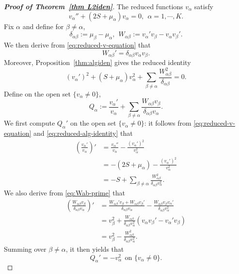 \documentclass[11pt]{article}
\numberwithin{equation}{section}
\theoremstyle{definition}
\begin{document}
\begin{proof}[\normalfont \bfseries Proof of Theorem~\ref{thm L2iden}]
The reduced functions \(v_\alpha\) satisfy
\begin{equation}\label{eq:reduced-v-equation}
	v_\alpha''+(2S+\mu_\alpha)v_\alpha=0,
	\ \  \alpha=1,\cdots,K .
\end{equation}
Fix \(\alpha\)  and  define   for \(\beta\neq\alpha\),
\[
\delta_{\alpha\beta}:=\mu_\beta-\mu_\alpha,
\ \
W_{\alpha\beta}:=v_\alpha'v_\beta-v_\alpha v_\beta' .
\]
We then derive from \eqref{eq:reduced-v-equation} that
\begin{equation}\label{eq:Wab-prime}
	W_{\alpha\beta}'
	=
	\delta_{\alpha\beta}v_\alpha v_\beta .
\end{equation}
Moreover, Proposition~\ref{thm:algiden} gives the reduced identity
\begin{equation}\label{eq:reduced-alg-identity}
	(v_\alpha')^2+(S+\mu_\alpha)v_\alpha^2
	+
	\sum_{\beta\neq\alpha}
	\frac{W_{\alpha\beta}^2}{\delta_{\alpha\beta}}
	=0 .
\end{equation}
Define on the open set \(\{v_\alpha\neq0\}\),
\[
Q_\alpha
:=
\frac{v_\alpha'}{v_\alpha}
+
\sum_{\beta\neq\alpha}
\frac{W_{\alpha\beta}v_\beta}
{\delta_{\alpha\beta}v_\alpha}.
\]
We first compute \(Q_\alpha'\) on the open set \(\{v_\alpha\neq0\}\): it follows from
\eqref{eq:reduced-v-equation} and \eqref{eq:reduced-alg-identity} that
\[
\begin{aligned}
	\left(\frac{v_\alpha'}{v_\alpha}\right)'
	&=
	\frac{v_\alpha''}{v_\alpha}
	-
	\frac{(v_\alpha')^2}{v_\alpha^2}  \\
	&=
	-(2S+\mu_\alpha)
	-
	\frac{(v_\alpha')^2}{v_\alpha^2}  \\
	&=
	-S+
	\sum_{\beta\neq\alpha}
	\frac{W_{\alpha\beta}^2}
	{\delta_{\alpha\beta}v_\alpha^2}.
\end{aligned}
\]
We also derive from \eqref{eq:Wab-prime} that
\[
\begin{aligned}
	\left(
	\frac{W_{\alpha\beta}v_\beta}
	{\delta_{\alpha\beta}v_\alpha}
	\right)'
	&=
	\frac{W_{\alpha\beta}'v_\beta+W_{\alpha\beta}v_\beta'}
	{\delta_{\alpha\beta}v_\alpha}
	-
	\frac{W_{\alpha\beta}v_\beta v_\alpha'}
	{\delta_{\alpha\beta}v_\alpha^2} \\
	&=
	v_\beta^2
	+
	\frac{W_{\alpha\beta}}
	{\delta_{\alpha\beta}v_\alpha^2}
	\left(v_\alpha v_\beta'-v_\alpha'v_\beta\right) \\
	&=
	v_\beta^2
	-
	\frac{W_{\alpha\beta}^2}
	{\delta_{\alpha\beta}v_\alpha^2}.
\end{aligned}
\]
Summing over \(\beta\neq\alpha\), it then yields that
\begin{equation}\label{eq:Q-prime}
	Q_\alpha'=-v_\alpha^2
	\ \  \text{on } \{v_\alpha\neq0\}.
\end{equation}


\end{proof}
\end{document}
